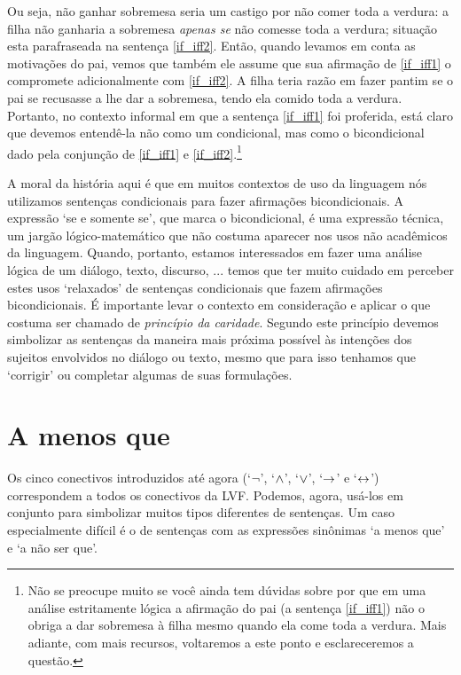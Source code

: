 Ou seja, não ganhar sobremesa seria um castigo por não comer toda a verdura:
a filha não ganharia a sobremesa \emph{apenas se} não comesse toda a verdura; situação esta parafraseada na sentença \ref{if_iff2}.
Então, quando levamos em conta as motivações do pai, vemos que também ele assume que sua afirmação de \ref{if_iff1} o compromete adicionalmente com \ref{if_iff2}.
A filha teria razão em fazer pantim se o pai se recusasse a lhe dar a sobremesa, tendo ela comido toda a verdura.
Portanto, no contexto informal em que a sentença \ref{if_iff1} foi proferida, está claro que devemos entendê-la não como um condicional, mas como o bicondicional dado pela conjunção de \ref{if_iff1} e \ref{if_iff2}.\footnote{
	Não se preocupe muito se você ainda tem dúvidas sobre por que em uma análise estritamente lógica a afirmação do pai (a sentença \ref{if_iff1}) não o obriga a dar sobremesa à filha mesmo quando ela come toda a verdura.
	Mais adiante, com mais recursos, voltaremos a este ponto e esclareceremos a questão.}

A moral da história aqui é que em muitos contextos de uso da linguagem nós utilizamos sentenças condicionais para fazer afirmações bicondicionais.
A expressão `se e somente se', que marca o bicondicional, é uma expressão técnica, um jargão lógico-matemático que não costuma aparecer nos usos não acadêmicos da linguagem.
Quando, portanto, estamos interessados em fazer uma análise lógica de um diálogo, texto, discurso, ... temos que ter muito cuidado em perceber estes usos `relaxados' de sentenças condicionais que fazem afirmações bicondicionais.
É importante levar o contexto em consideração e aplicar o que costuma ser chamado de  \emph{princípio da caridade}.
Segundo este princípio devemos simbolizar as sentenças da maneira mais próxima possível às intenções dos sujeitos envolvidos no diálogo ou texto, mesmo que para isso tenhamos que `corrigir' ou completar algumas de suas formulações.


\section{A menos que}
Os cinco conectivos introduzidos até agora (`$\neg$', `$\wedge$', `$\vee$', `$\rightarrow$' e `$\leftrightarrow$') correspondem a todos os conectivos da LVF.
Podemos, agora, usá-los em conjunto para simbolizar muitos tipos diferentes de sentenças.
Um caso especialmente difícil é o de sentenças com as expressões sinônimas  `a menos que' e `a não ser que'.

